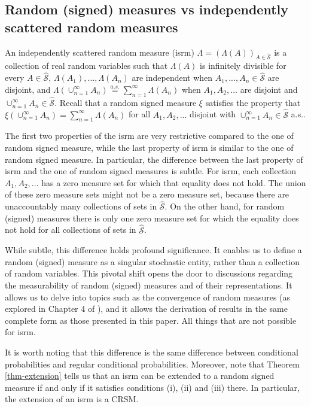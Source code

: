 \documentclass{article}
\theoremstyle{plain}
\theoremstyle{remark}
\begin{document}
\subsection{Random (signed) measures vs independently scattered random measures}
An independently scattered random measure (isrm) $\Lambda=(\Lambda(A))_{A\in\hat{\mathcal{S}}}$ is a collection of real random variables such that $\Lambda(A)$ is infinitely divisible for every $A\in\hat{\mathcal{S}}$, $\Lambda(A_1),...,\Lambda(A_n)$ are independent when $A_1,...,A_n\in\hat{\mathcal{S}}$ are disjoint, and $\Lambda(\cup_{n=1}^\infty A_n)\stackrel{a.s.}{=}\sum_{n=1}^\infty \Lambda(A_n)$ when $A_1,A_2,...$ are disjoint and $\cup_{n=1}^\infty A_n\in\hat{\mathcal{S}}$. Recall that a random signed measure $\xi$ satisfies the property that $\xi(\cup_{n=1}^\infty A_n)=\sum_{n=1}^\infty \Lambda(A_n)$ for all $A_1,A_2,...$ disjoint with $\cup_{n=1}^\infty A_n\in\hat{\mathcal{S}}$ a.s.. 

The first two properties of the isrm are very restrictive compared to the one of random signed measure, while the last property of isrm is similar to the one of random signed measure. In particular, the difference between the last property of isrm and the one of random signed measures is subtle. For isrm, each collection $A_1,A_2,...$ has a zero measure set for which that equality does not hold. The union of these zero measure sets might not be a zero measure set, because there are unaccountably many collections of sets in $\hat{\mathcal{S}}$. On the other hand, for random (signed) measures there is only one zero measure set for which the equality does not hold for all collections of sets in $\hat{\mathcal{S}}$.

While subtle, this difference holds profound significance. It enables us to define a random (signed) measure as a singular stochastic entity, rather than a collection of random variables. This pivotal shift opens the door to discussions regarding the measurability of random (signed) measures and of their representations. It allows us to delve into topics such as the convergence of random measures (as explored in Chapter 4 of \citet{Kallenberg2}), and it allows the derivation of results in the same complete form as those presented in this paper. All things that are not possible for isrm. 

It is worth noting that this difference is the same difference between conditional probabilities and regular conditional probabilities. Moreover, note that Theorem \ref{thm-extension} tells us that an isrm can be extended to a random signed measure if and only if it satisfies conditions (i), (ii) and (iii) there.  In particular, the extension of an isrm is a CRSM.
\end{document}
